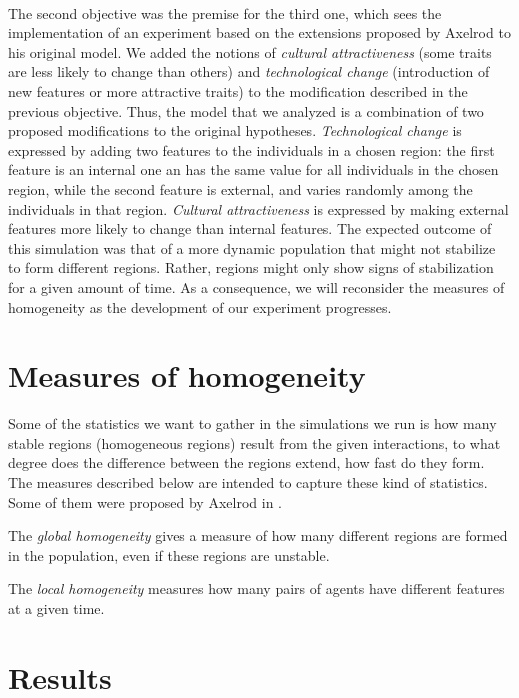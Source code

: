 \documentclass[twoside, 11pt, a4paper]{article}
\begin{document}
\paragraph*{ }The second objective was the premise for the third one, which sees the implementation of an experiment based on the extensions proposed by Axelrod to his original model. We added the notions of \emph{cultural attractiveness} (some traits are less likely to change than others) and \emph{technological change} (introduction of new features or more attractive traits) to the modification described in the previous objective. Thus, the model that we analyzed is a combination of two proposed modifications to the original hypotheses. 
\emph{Technological change} is expressed by adding two features to the individuals in a chosen region: the first feature is an internal one an has the same value for all individuals in the chosen region, while the second feature is external, and varies randomly among the individuals in that region.
\emph{Cultural attractiveness} is expressed by making external features more likely to change than internal features. 
The expected outcome of this simulation was that of a more dynamic population that might not stabilize to form different regions. Rather, regions might only show signs of stabilization for a given amount of time. As a consequence, we will reconsider the measures of homogeneity as the development of our experiment progresses.

\section{Measures of homogeneity}

Some of the statistics we want to gather in the simulations we run is how many stable regions (homogeneous regions) result from the given interactions, to what degree does the difference between the regions extend, how fast do they form.
The measures described below are intended to capture these kind of statistics. Some of them were proposed by Axelrod in \cite{Axelrod}.

The \emph{global homogeneity} gives a measure of how many different regions are formed in the population, even if these regions are unstable.

The \emph{local homogeneity} measures how many pairs of agents have different features at a given time.

\section{Results}
\end{document}
